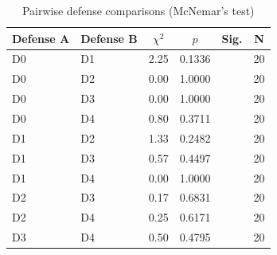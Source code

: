 \begin{table}[t]
\centering
\small
\begin{tabular}{ll c c c c}
\toprule
Defense A & Defense B & $\chi^2$ & $p$ & Sig. & N \\
\midrule
D0 & D1 & 2.25 & 0.1336 &  & 20 \\
D0 & D2 & 0.00 & 1.0000 &  & 20 \\
D0 & D3 & 0.00 & 1.0000 &  & 20 \\
D0 & D4 & 0.80 & 0.3711 &  & 20 \\
D1 & D2 & 1.33 & 0.2482 &  & 20 \\
D1 & D3 & 0.57 & 0.4497 &  & 20 \\
D1 & D4 & 0.00 & 1.0000 &  & 20 \\
D2 & D3 & 0.17 & 0.6831 &  & 20 \\
D2 & D4 & 0.25 & 0.6171 &  & 20 \\
D3 & D4 & 0.50 & 0.4795 &  & 20 \\
\bottomrule
\end{tabular}
\caption{Pairwise defense comparisons (McNemar's test)}
\label{tab:mcnemar}
\end{table}